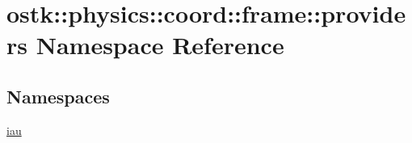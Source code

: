 \hypertarget{namespaceostk_1_1physics_1_1coord_1_1frame_1_1providers}{}\section{ostk\+:\+:physics\+:\+:coord\+:\+:frame\+:\+:providers Namespace Reference}
\label{namespaceostk_1_1physics_1_1coord_1_1frame_1_1providers}
\subsection*{Namespaces}
\begin{DoxyCompactItemize}
\item 
 \hyperlink{namespaceostk_1_1physics_1_1coord_1_1frame_1_1providers_1_1iau}{iau}
\end{DoxyCompactItemize}
